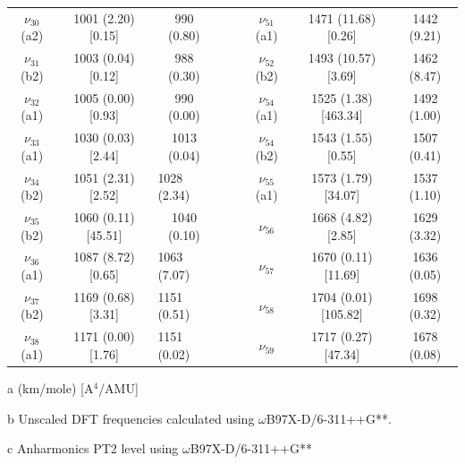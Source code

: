 \begin{table}[H]
\begin{center}
\begin{threeparttable}
{\begin{tabular}{c c c c c c c c}
$\nu_{30}$ (a2) & 1001 (2.20) [0.15] & 990 (0.80) &  &  & $\nu_{51}$ (a1) & 1471 (11.68) [0.26] & 1442 (9.21)  \\ 
$\nu_{31}$ (b2) & 1003 (0.04) [0.12] & 988 (0.30) &  &  & $\nu_{52}$ (b2) & 1493 (10.57) [3.69] & 1462 (8.47) \\ 
$\nu_{32}$ (a1)
& 1005 (0.00) [0.93] & 990 (0.00) &  &  & $\nu_{54}$ (a1) & 1525 (1.38) [463.34] & 1492 (1.00) \\ 
$\nu_{33}$ (a1) & 1030 (0.03) [2.44] & 1013 (0.04) &  &  &   $\nu_{54}$ (b2) & 1543 (1.55) [0.55] & 1507 (0.41) \\ 
$\nu_{34}$ (b2) & 1051 (2.31) [2.52] & \multicolumn{1}{l}{1028 (2.34)} &  &  &   $\nu_{55}$ (a1) & 1573 (1.79) [34.07] & 1537 (1.10) \\ 
$\nu_{35}$ (b2)  & 1060 (0.11) [45.51] & 1040 (0.10) &  &  & $\nu_{56}$ & 1668 (4.82) [2.85] & 1629 (3.32) \\ 
$\nu_{36}$ (a1) & 1087 (8.72) [0.65] & \multicolumn{1}{l}{1063 (7.07)} &  &  & $\nu_{57}$ & 1670 (0.11) [11.69] & 1636 (0.05) \\ 
$\nu_{37}$ (b2) & 1169 (0.68) [3.31] & \multicolumn{1}{l}{1151 (0.51)} &  &  & $\nu_{58}$ & 1704 (0.01) [105.82] & 1698 (0.32) \\ 
$\nu_{38}$ (a1) & 1171 (0.00) [1.76] & \multicolumn{1}{l}{1151 (0.02)} &  &  & $\nu_{59}$ & 1717 (0.27) [47.34] & 1678 (0.08) \\ 		
	\bottomrule
\end{tabular}}

\begin{tablenotes}
	\item[a] (km/mole) [A$^{4}$/AMU]
	\item[b] Unscaled DFT frequencies calculated using $\omega$B97X-D/6-311++G**.
	\item[c] Anharmonics PT2 level using $\omega$B97X-D/6-311++G** 
\end{tablenotes}
\end{threeparttable}
\end{center}
\label{freq-Cyclopentaphenanthrene}
\end{table}

			


